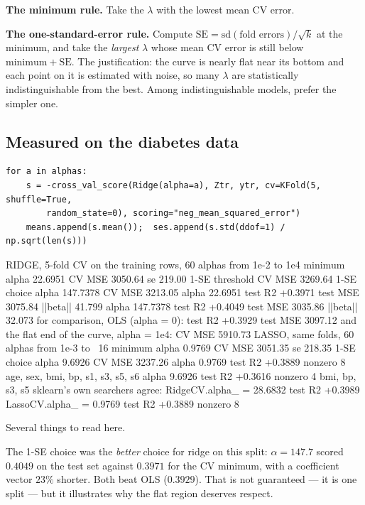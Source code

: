\documentclass[11pt]{article}
\begin{document}
\textbf{The minimum rule.} Take the $\lambda$ with the lowest mean CV error.

\textbf{The one-standard-error rule.} Compute
$\mathrm{SE} = \mathrm{sd}(\text{fold errors})/\sqrt{k}$ at the minimum, and
take the \emph{largest} $\lambda$ whose mean CV error is still below
$\text{minimum} + \mathrm{SE}$. The justification: the curve is nearly flat
near its bottom and each point on it is estimated with noise, so many
$\lambda$ are statistically indistinguishable from the best. Among
indistinguishable models, prefer the simpler one.

\subsection{Measured on the diabetes data}

\begin{lstlisting}
for a in alphas:
    s = -cross_val_score(Ridge(alpha=a), Ztr, ytr, cv=KFold(5, shuffle=True,
        random_state=0), scoring="neg_mean_squared_error")
    means.append(s.mean());  ses.append(s.std(ddof=1) / np.sqrt(len(s)))
\end{lstlisting}
\begin{codeout}
RIDGE, 5-fold CV on the training rows, 60 alphas from 1e-2 to 1e4
  minimum        alpha   22.6951   CV MSE  3050.64   se 219.00
  1-SE threshold                    CV MSE  3269.64
  1-SE choice    alpha  147.7378   CV MSE  3213.05
     alpha   22.6951  test R2 +0.3971  test MSE  3075.84  ||beta||   41.799
     alpha  147.7378  test R2 +0.4049  test MSE  3035.86  ||beta||   32.073
  for comparison, OLS (alpha = 0): test R2 +0.3929  test MSE  3097.12
  and the flat end of the curve, alpha = 1e4: CV MSE  5910.73
LASSO, same folds, 60 alphas from 1e-3 to ~16
  minimum        alpha    0.9769   CV MSE  3051.35   se 218.35
  1-SE choice    alpha    9.6926   CV MSE  3237.26
     alpha    0.9769  test R2 +0.3889  nonzero  8  age, sex, bmi, bp, s1, s3, s5, s6
     alpha    9.6926  test R2 +0.3616  nonzero  4  bmi, bp, s3, s5
sklearn's own searchers agree:
  RidgeCV.alpha_ = 28.6832   test R2 +0.3989
  LassoCV.alpha_ = 0.9769   test R2 +0.3889   nonzero 8
\end{codeout}

Several things to read here.

The 1-SE choice was the \emph{better} choice for ridge on this split:
$\alpha = 147.7$ scored $0.4049$ on the test set against $0.3971$ for the
CV minimum, with a coefficient vector $23\%$ shorter. Both beat OLS
($0.3929$). That is not guaranteed --- it is one split --- but it illustrates
why the flat region deserves respect.
\end{document}
